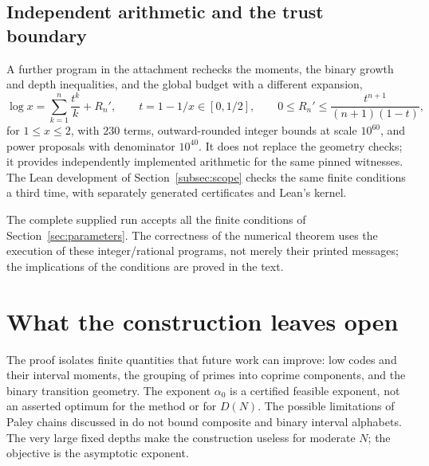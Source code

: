 \documentclass[11pt]{article}
\theoremstyle{definition}
\theoremstyle{remark}
\newcommand{\al}{\alpha_0}
\begin{document}
\subsection{Independent arithmetic and the trust boundary}
A further program in the attachment rechecks the moments, the binary growth
and depth inequalities, and the global budget with a different expansion,
\[
 \log x=\sum_{k=1}^{n}\frac{t^k}{k}+R_n',\qquad
 t=1-1/x\in[0,1/2],\qquad
 0\le R_n'\le\frac{t^{n+1}}{(n+1)(1-t)},
\]
for $1\le x\le2$, with $230$ terms, outward-rounded integer bounds at scale
$10^{60}$, and power proposals with denominator $10^{40}$. It does not
replace the geometry checks; it provides independently implemented arithmetic
for the same pinned witnesses. The Lean development of
Section~\ref{subsec:scope} checks the same finite conditions a third time,
with separately generated certificates and Lean's kernel.

The complete supplied run accepts all the finite conditions of
Section~\ref{sec:parameters}. The correctness of the numerical theorem uses
the execution of these integer/rational programs, not merely their printed
messages; the implications of the conditions are proved in the text.

\section{What the construction leaves open}\label{sec:discussion}
The proof isolates finite quantities that future work can improve: low codes
and their interval moments, the grouping of primes into coprime components,
and the binary transition geometry. The exponent $\al$ is a certified
feasible exponent, not an asserted optimum for the method or for $D(N)$. The
possible limitations of Paley chains discussed in \cite{Krachun2026,Satake2021}
do not bound composite and binary interval alphabets. The very large fixed
depths make the construction useless for moderate $N$; the objective is the
asymptotic exponent.
\end{document}
